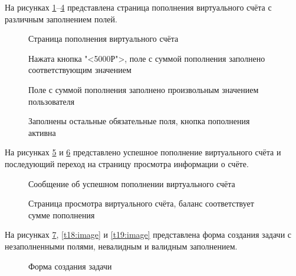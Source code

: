 На рисунках \ref{t11:image}--\ref{t14:image} представлена страница пополнения виртуального счёта с различным заполнением полей.

\begin{figure}[ht]
	\caption{Страница пополнения виртуального счёта}
	\label{t11:image}
\end{figure}

\begin{figure}[ht]
	\caption{Нажата кнопка "<5000Р">, поле с суммой пополнения заполнено соответствующим значением}
	\label{t12:image}
\end{figure}

\begin{figure}[ht]
	\caption{Поле с суммой пополнения заполнено произвольным значением пользователя}
	\label{t13:image}
\end{figure}

\begin{figure}[ht]
	\caption{Заполнены остальные обязательные поля, кнопка пополнения активна}
	\label{t14:image}
\end{figure}
\clearpage

На рисунках \ref{t15:image} и \ref{t16:image} представлено успешное пополнение виртуального счёта и последующий переход на страницу просмотра информации о счёте.

\begin{figure}[ht]
	\caption{Сообщение об успешном пополнении виртуального счёта}
	\label{t15:image}
\end{figure}

\begin{figure}[ht]
	\caption{Страница просмотра виртуального счёта, баланс соответствует сумме пополнения}
	\label{t16:image}
\end{figure}

На рисунках \ref{t17:image}, \ref{t18:image} и \ref{t19:image} представлена форма создания задачи с незаполненными полями, невалидным и валидным заполнением.

\begin{figure}[ht]
	\caption{Форма создания задачи}
	\label{t17:image}
\end{figure}

